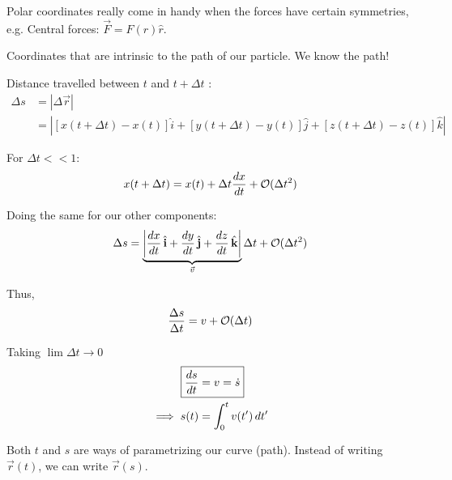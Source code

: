 \documentclass[10pt]{scrartcl}
\begin{document}
Polar coordinates really come in handy when the forces have certain symmetries, e.g. Central forces: $\vec{F} = F(r)\hat{r}$.




Coordinates 
 that are intrinsic to the path of our particle. We know the path!
 
\begin{center}
\end{center}

Distance travelled between $t$ and $t + \Delta t$
:
\[\begin{aligned}\Delta s &= |\Delta \vec{r}|\\
& = \left|[x(t + \Delta t) - x(t)]\hat{i} + [y(t + \Delta t) - y(t)]\hat{j} + [z(t + \Delta t) - z(t)]\hat{k}\right|	
\end{aligned}
\]

For $\Delta t << 1$: 
\[x(t + \Delta t) = x(t) + \Delta t \frac{dx}{dt} + \cal{O}(\Delta t^2)\]

Doing the same for our other components:
\[\Delta s = \underbrace{\left|\frac{dx}{dt}\hat{i} + \frac{dy}{dt}\hat{j} + \frac{dz}{dt}\hat{k}\right|}_{\vec{v}}\Delta t + \cal{O}(\Delta t^2)\]

Thus,
\[\frac{\Delta s}{\Delta t} = v + \cal{O}(\Delta t)\]

Taking $\lim \Delta t \to 0$
\[\begin{aligned}\Aboxed{\frac{ds}{dt} &= v = \dot{s}}\\ 
\implies s(t) &= \int_0^t v(t')\,dt'	
\end{aligned}
\]

Both $t$ and $s$ are ways of parametrizing our curve (path). Instead of writing $\vec{r}(t)$, we can write $\vec{r}(s)$. \\
\end{document}
